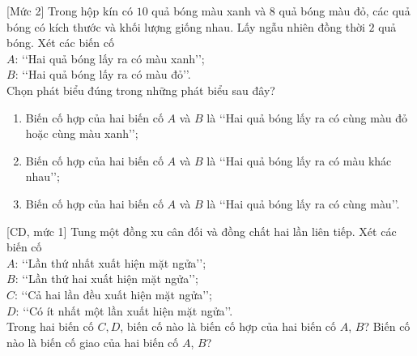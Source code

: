\begin{bt}%
[Mức 2]
	Trong hộp kín có $10$ quả bóng màu xanh và $8$ quả bóng màu đỏ, các quả bóng có kích thước và khối lượng giống nhau. Lấy ngẫu nhiên đồng thời $2$ quả bóng. Xét các biến cố\\
	$A$: \lq\lq Hai quả bóng lấy ra có màu xanh\rq\rq;\\
	$B$: \lq\lq Hai quả bóng lấy ra có màu đỏ\rq\rq.\\
	Chọn phát biểu đúng trong những phát biểu sau đây?
	\begin{enumerate}
		\item Biến cố hợp của hai biến cố $A$ và $B$ là \lq\lq Hai quả bóng lấy ra có cùng màu đỏ hoặc cùng màu xanh\rq\rq;
		\item Biến cố hợp của hai biến cố $A$ và $B$ là \lq\lq Hai quả bóng lấy ra có màu khác nhau\rq\rq;
		\item Biến cố hợp của hai biến cố $A$ và $B$ là \lq\lq Hai quả bóng lấy ra có cùng màu\rq\rq.
	\end{enumerate}
\end{bt}

\begin{bt}%
[CD, mức 1]%
	Tung một đồng xu cân đối và đồng chất hai lần liên tiếp. Xét các biến cố\\
	$A$: \lq\lq Lần thứ nhất xuất hiện mặt ngửa\rq\rq;\\
	$B$: \lq\lq Lần thứ hai xuất hiện mặt ngửa\rq\rq;\\
	$C$: \lq\lq Cả hai lần đều xuất hiện mặt ngửa\rq\rq;\\
	$D$: \lq\lq Có ít nhất một lần xuất hiện mặt ngửa\rq\rq.\\
	Trong hai biến cố $C, D$, biến cố nào là biến cố hợp của hai biến cố $A$, $B$? Biến cố nào là biến cố giao của hai biến cố $A$, $B$?
\end{bt}

